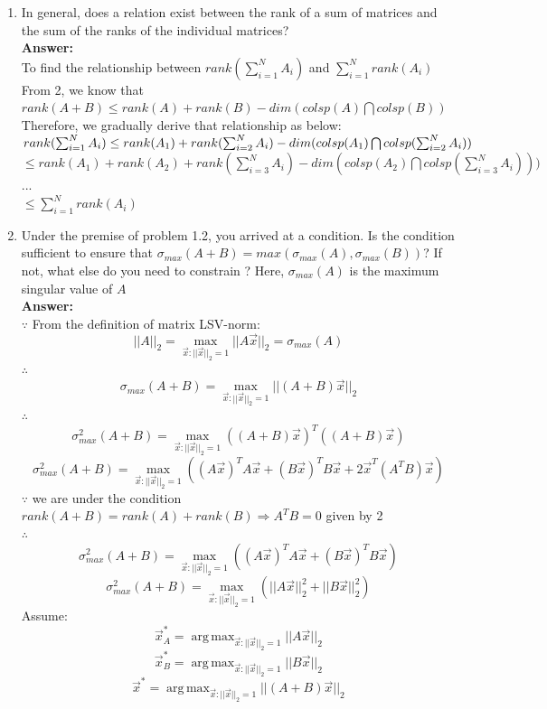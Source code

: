 \documentclass[letterpaper,11pt]{article}
\DeclareMathOperator*{\argmax}{arg\,max}
\begin{document}
\begin{enumerate}
\item In general, does a relation exist between the rank of a sum of matrices and the sum of the ranks of the individual matrices?\\
\textbf{Answer:}\\
To find the relationship between $rank(\sum_{i=1}^{N}{A_i})$ and $\sum_{i=1}^{N}{rank(A_i)}$\\
From 2, we know that $rank(A+B) \leq rank(A)+rank(B)-dim(colsp(A) \bigcap colsp(B))$\\
Therefore, we gradually derive that relationship as below:\\
$rank(\sum_{i=1}^{N}{A_i}) \\
\leq rank(A_1) + rank(\sum_{i=2}^{N}{A_i}) - dim(colsp(A_1) \bigcap colsp(\sum_{i=2}^{N}{A_i}))$\\
$\leq rank(A_1) + rank(A_2) + rank(\sum_{i=3}^{N}{A_i}) - dim(colsp(A_2) \bigcap colsp(\sum_{i=3}^{N}{A_i})))$\\
$...$\\
$\leq \sum_{i=1}^{N}{rank(A_i)}$

\item Under the premise of problem 1.2, you arrived at a condition. Is the condition sufficient to ensure that $\sigma_{max} (A+B) = max (\sigma_{max} (A), \sigma_{max}(B))$? If not, what else do you need to constrain ? Here, $\sigma_{max} (A)$ is the maximum singular value of $A$\\
\textbf{Answer:}\\
$\because$ From the definition of matrix LSV-norm: $$||A||_2=\max_{\vec{x}:||\vec{x}||_2=1}{||A\vec{x}||_2}=\sigma_{max}(A)$$
$\therefore$ $$\sigma_{max}(A+B)=\max_{\vec{x}:||\vec{x}||_2=1}{||(A+B)\vec{x}||_2}$$
$\therefore$ $$\sigma_{max}^2(A+B)=\max_{\vec{x}:||\vec{x}||_2=1}{((A+B)\vec{x})^T((A+B)\vec{x})}$$
$$\sigma_{max}^2(A+B)=\max_{\vec{x}:||\vec{x}||_2=1}{((A\vec{x})^TA\vec{x}+(B\vec{x})^TB\vec{x}+2\vec{x}^T(A^TB)\vec{x})}$$
$\because$ we are under the condition $rank(A+B)=rank(A)+rank(B) \Rightarrow A^TB=0$ given by 2\\
$\therefore$ $$\sigma_{max}^2(A+B)=\max_{\vec{x}:||\vec{x}||_2=1}{((A\vec{x})^TA\vec{x}+(B\vec{x})^TB\vec{x})}$$
$$\sigma_{max}^2(A+B)=\max_{\vec{x}:||\vec{x}||_2=1}{(||A\vec{x}||_2^2+||B\vec{x}||_2^2)}$$
Assume:
$$\vec{x}_A^*=\argmax_{\vec{x}:||\vec{x}||_2=1}{||A\vec{x}||_2}$$
$$\vec{x}_B^*=\argmax_{\vec{x}:||\vec{x}||_2=1}{||B\vec{x}||_2}$$
$$\vec{x}^*=\argmax_{\vec{x}:||\vec{x}||_2=1}{||(A+B)\vec{x}||_2}$$


\end{enumerate}
\end{document}
